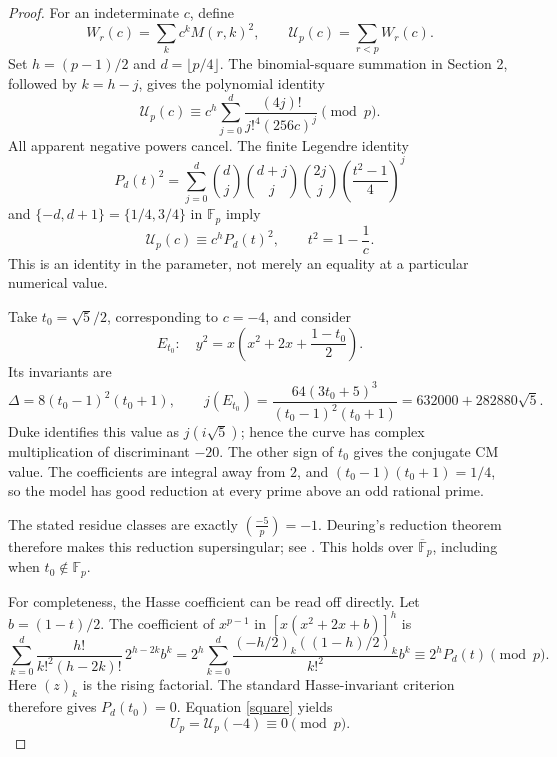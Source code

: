 \documentclass[11pt,a4paper]{article}
\theoremstyle{remark}\newtheorem{remark}[theorem]{Remark}
\newcommand{\F}{\mathbb F}
\begin{document}
\begin{proof}
For an indeterminate \(c\), define
\[
 W_r(c)=\sum_k c^kM(r,k)^2,\qquad
 \mathcal U_p(c)=\sum_{r<p}W_r(c).
\]
Set \(h=(p-1)/2\) and \(d=\lfloor p/4\rfloor\).
The binomial-square summation in Section 2, followed by \(k=h-j\),
gives the polynomial identity
\begin{equation}\label{Upoly}
 \mathcal U_p(c)\equiv
 c^h\sum_{j=0}^{d}\frac{(4j)!}{j!^4(256c)^j}\pmod p.
\end{equation}
All apparent negative powers cancel. The finite Legendre identity
\[
 P_d(t)^2=\sum_{j=0}^d\binom dj\binom{d+j}j\binom{2j}j
                   \left(\frac{t^2-1}{4}\right)^j
\]
and \(\{-d,d+1\}=\{1/4,3/4\}\) in \(\F_p\) imply
\begin{equation}\label{square}
 \mathcal U_p(c)\equiv c^hP_d(t)^2,\qquad t^2=1-\frac1c.
\end{equation}
This is an identity in the parameter, not merely an equality at a
particular numerical value.

Take \(t_0=\sqrt5/2\), corresponding to \(c=-4\), and consider
\[
 E_{t_0}:\quad y^2=x\left(x^2+2x+\frac{1-t_0}{2}\right).
\]
Its invariants are
\[
 \Delta=8(t_0-1)^2(t_0+1),\qquad
 j(E_{t_0})=
 \frac{64(3t_0+5)^3}{(t_0-1)^2(t_0+1)}
 =632000+282880\sqrt5.
\]
Duke \cite{Duke} identifies this value as \(j(i\sqrt5)\); hence the
curve has complex multiplication of discriminant \(-20\).
The other sign of \(t_0\) gives the conjugate CM value.
The coefficients are integral away from \(2\), and
\((t_0-1)(t_0+1)=1/4\), so the model has good reduction at every
prime above an odd rational prime.

The stated residue classes are exactly
\(\left(\frac{-5}{p}\right)=-1\). Deuring's reduction theorem therefore
makes this reduction supersingular; see \cite{EOY}.
This holds over \(\overline{\F}_p\), including when \(t_0\notin\F_p\).

For completeness, the Hasse coefficient can be read off directly.
Let \(b=(1-t)/2\). The coefficient of \(x^{p-1}\) in
\([x(x^2+2x+b)]^h\) is
\[
 \sum_{k=0}^{d}\frac{h!}{k!^2(h-2k)!}\,2^{h-2k}b^k
 =
 2^h\sum_{k=0}^{d}
 \frac{(-h/2)_k((1-h)/2)_k}{k!^2}b^k
 \equiv2^hP_d(t)\pmod p.
\]
Here \((z)_k\) is the rising factorial.
The standard Hasse-invariant criterion \cite[Theorem V.4.1(a)]{Silverman}
therefore gives \(P_d(t_0)=0\). Equation \eqref{square} yields
\begin{equation}\label{Uzero} U_p=\mathcal U_p(-4)\equiv0\pmod p.\end{equation}


\end{proof}
\end{document}
